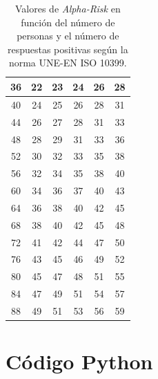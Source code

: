 \documentclass[11pt,a4paper]{book}
\begin{document}
\begin{table}[H]
\begin{center}
\begin{scriptsize}
\begin{tabular}{| c || c | c | c | c | c |}
                36&22&23&24&26&28\\ \hline
                40&24&25&26&28&31\\ \hline
                44&26&27&28&31&33\\ \hline
                48&28&29&31&33&36\\ \hline
                52&30&32&33&35&38\\ \hline
                56&32&34&35&38&40\\ \hline
                60&34&36&37&40&43\\ \hline
                64&36&38&40&42&45\\ \hline
                68&38&40&42&45&48\\ \hline
                72&41&42&44&47&50\\ \hline
                76&43&45&46&49&52\\ \hline
                80&45&47&48&51&55\\ \hline
                84&47&49&51&54&57\\ \hline
                88&49&51&53&56&59\\ \hline
			\end{tabular}
			\caption{Valores de \textit{Alpha-Risk} en función del número de personas y el número de respuestas positivas según la norma UNE-EN ISO 10399.}
			\label{tablaAlpha}
			\end{scriptsize}
			\end{center}	
		\end{table}
		
\chapter{Código Python}
\end{document}
